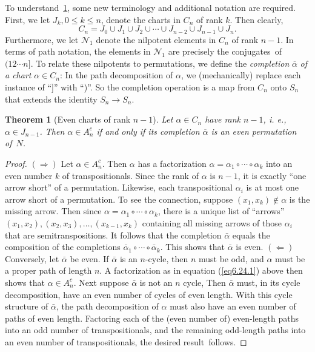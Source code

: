 \documentclass{surv-l}
\numberwithin{equation}{section}
\numberwithin{table}{section}
\numberwithin{figure}{section}
\newtheorem{theorem}[equation]{Theorem}
\theoremstyle{definition}
\begin{document}
To understand~\ref{thm6.25.1}, some new terminology and additional
notation are required. First, we let $J_{k}, 0\leq k\leq n$,
denote the charts in $C_{n}$ of rank $k$. Then clearly,
\[
C_{n}=J_{0}\cup J_{1}\cup J_{2}\cup\cdots\cup J_{n-2}\cup J_{n-1}\cup J_{n}.
\]
Furthermore, we let $\mathcal{N}_{1}$ denote the nilpotent
elements in $C_{n}$ of rank $n-1$. In terms of path notation, the
elements in $\mathcal{N}_{1}$ are precisely the conjugates~of
$(12\cdots n]$. To relate these nilpotents to permutations, we
define the \emph{completion} $\overline{\alpha}$ \emph{of a
chart} $\alpha\in C_{n}$: In the path decomposition of $\alpha$,
we (mechanically) replace each instance of ``]'' with ``)''. So
the completion operation is a map from $C_{n}$ onto $S_{n}$ that
extends the identity $S_{n}\rightarrow S_{n}$.

\begin{theorem}[Even charts of rank $n -1$]\label{thm6.25.1}
Let $\alpha\in C_{n}$ have rank $n-1$, i. e., $\alpha\in J_{n-1}$.
Then $\alpha\in A_{n}^{c}$ if and only if its completion
$\overline{\alpha}$ is an even permutation of~$N$.
\end{theorem}

\begin{proof} $(\Rightarrow)$ Let $\alpha\in A_{n}^{c}$. Then $\alpha$
has a factorization $\alpha=\alpha_{1}\circ \cdots\circ\alpha_{k}$
into an even number $k$ of transpositionals. Since the rank of
$\alpha$ is $n -1$, it is exactly ``one arrow short'' of a
permutation. Likewise, each transpositional $\alpha_{i}$ is at
most one arrow short of a permutation. To see the connection,
suppose $(x_{1}, x_{k})\not\in\alpha$ is the missing arrow. Then
since $\alpha=\alpha_{1}\circ\cdots \circ\alpha_{k}$, there is a
unique list of ``arrows'' $(x_{1}, x_{2}), (x_{2}, x_{3}),\ldots,
(x_{k-1}, x_{k})$ containing all missing arrows of those
$\alpha_{i}$ that are semitranspositions. It follows that the
completion $\bar{\alpha}$ equals the composition of the
completions $\bar{\alpha}_{1}\circ\cdots \circ\bar{\alpha}_{k}$.
This shows that $\bar{\alpha}$ is even. $(\Leftarrow)$ Conversely,
let $\bar{\alpha}$ be even. If $\bar{\alpha}$ is an $n$-cycle,
then $n$ must be odd, and $\alpha$ must be a proper path of length
$n$. A factorization as in equation (\ref{eq6.24.1}) above then
shows that $\alpha\in A_{n}^{c}$. Next suppose $\bar{\alpha}$ is
not an $n$ cycle, Then $\bar{\alpha}$ must, in its cycle
decomposition, have an even number of cycles of even length. With
this cycle structure of $\bar{\alpha}$, the path decomposition of
$\alpha$ must also have an even number of paths of even length.
Factoring each of the (even number of) even-length paths into an
odd number of transpositionals, and the remaining odd-length paths
into an even number of transpositionals, the desired
result~follows.
\end{proof}
\end{document}
